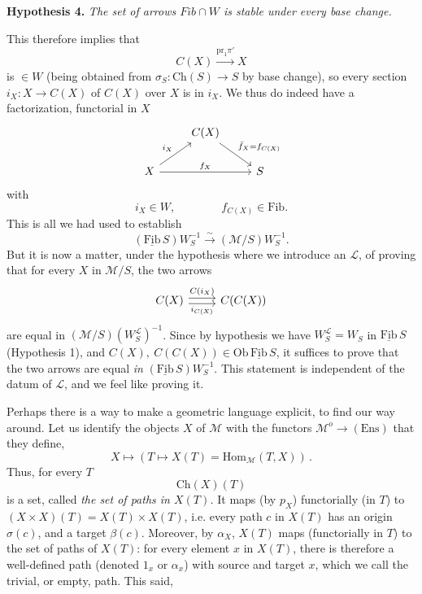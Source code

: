 \documentclass[11pt]{article}
\newcommand{\printedpage}[1]{\marginpar{\footnotesize p.~#1}}
\newcommand{\msp}[1]{\marginpar{\footnotesize [#1]}}
\newcommand{\Fib}{\underline{\mathrm{Fib}}}
\newcommand{\Ch}{\mathrm{Ch}}
\newcommand{\pr}{\mathrm{pr}}
\begin{document}
\textbf{Hypothesis 4.} \textit{The set of arrows $\mathit{Fib}\cap W$ is stable under every base change.}


\printedpage{65}

\msp{page 103}
This therefore implies that
\[
C(X)\xrightarrow{\pr_1\pi'}X
\]
 is $\in W$ (being obtained from $\sigma_S : \Ch(S)\longrightarrow S$ by base change), so every section $i_X : X\longrightarrow C(X)$ of $C(X)$ over $X$ is in $i_X$. We thus do indeed have a factorization, functorial in $X$
\[
\begin{tikzcd}
 & C(X) \arrow[dr, "\bar f_X=f_{C(X)}"] & \\
X \arrow[ur, "i_X"] \arrow[rr, "f_X"] & & S
\end{tikzcd}
\]
with
\[
i_X\in W,\qquad\qquad f_{C(X)}\in\mathrm{Fib}.
\]
This is all we had used to establish
\[
(\Fib\,S)W_S^{-1}\xrightarrow{\sim}(\mathcal{M}/S)W_S^{-1}.
\]
But it is now a matter, under the hypothesis where we introduce an $\mathcal{L}$, of proving that for every $X$ in $\mathcal{M}/S$, the two arrows
\[
\begin{tikzcd}
C(X) \arrow[r, shift left, "C(i_X)"] \arrow[r, shift right, "i_{C(X)}"'] & C(C(X))
\end{tikzcd}
\]
are equal in $(\mathcal{M}/S)(W_S^{\mathcal{L}})^{-1}$. Since by hypothesis we have $W_S^{\mathcal{L}}=W_S$ in $\Fib\,S$ (Hypothesis 1), and $C(X),\ C(C(X))\in\mathrm{Ob}\,\Fib\,S$,
\msp{page 104}
it suffices to prove that the two arrows are equal \textit{in} $(\Fib\,S)W_S^{-1}$. This statement is independent of the datum of $\mathcal{L}$, and we feel like proving it.

Perhaps there is a way to make a geometric language explicit, to find our way around. Let us identify the objects $X$ of $\mathcal{M}$ with the functors $\mathcal{M}^o\longrightarrow(\mathrm{Ens})$ that they define,
\[
X\longmapsto(T\longmapsto X(T)=\mathrm{Hom}_{\mathcal{M}}(T,X))\,.
\]
Thus, for every $T$ %
\[
\Ch(X)(T)
\]
is a set, called \textit{the set of paths in $X(T)$.} It maps (by $p_X$) functorially (in $T$) to $(X\times X)(T)=X(T)\times X(T)$, i.e. every path $c$ in $X(T)$ has an origin $\sigma(c)$, and a target $\beta(c)$. Moreover, by $\alpha_X$, $X(T)$ maps (functorially in $T$) to the set of paths of $X(T)$: for every element $x$ in $X(T)$, there is therefore a well-defined path (denoted $1_x$ or $\alpha_x$) with source and target $x$, which we call the trivial, or empty, path. This said,


\printedpage{66}
\end{document}
